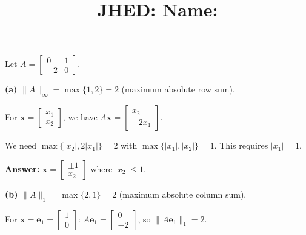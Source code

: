 \documentclass[reqno, answers]{exam}
\title{\normalsize{
  JHED: \underline{\hspace{4cm}} \hspace{1em} Name: \underline{\hspace{9cm}}}
   }
\author{}
\date{}
\begin{document}
\maketitle
\vspace{-2cm} %

\begin{questions}

\question 
Let $A = \begin{bmatrix} 0 & 1 \\ -2 & 0 \end{bmatrix}$.

\begin{solution}
\textbf{(a)} $\|A\|_\infty = \max\{1, 2\} = 2$ (maximum absolute row sum).

For $\mathbf{x} = \begin{bmatrix} x_1 \\ x_2 \end{bmatrix}$, we have $A\mathbf{x} = \begin{bmatrix} x_2 \\ -2x_1 \end{bmatrix}$.

We need $\max\{|x_2|, 2|x_1|\} = 2$ with $\max\{|x_1|, |x_2|\} = 1$. This requires $|x_1| = 1$.

\textbf{Answer:} $\mathbf{x} = \begin{bmatrix} \pm 1 \\ x_2 \end{bmatrix}$ where $|x_2| \leq 1$.

\textbf{(b)} $\|A\|_1 = \max\{2, 1\} = 2$ (maximum absolute column sum).

For $\mathbf{x} = \mathbf{e}_1 = \begin{bmatrix} 1 \\ 0 \end{bmatrix}$: $A\mathbf{e}_1 = \begin{bmatrix} 0 \\ -2 \end{bmatrix}$, so $\|A\mathbf{e}_1\|_1 = 2$.


\end{solution}
\end{questions}
\end{document}
